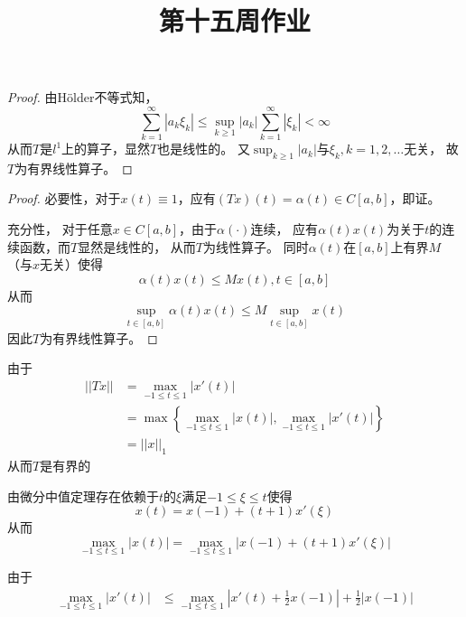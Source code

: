 \documentclass[cn]{homework}
\title{第十五周作业}
\begin{document}
    \maketitle

    \problem
    \begin{proof}
        由H\"older不等式知，
        \[\sum_{k=1}^\infty |a_k\xi_k|
        \leq\sup_{k\geq 1}|a_k|\sum_{k=1}^\infty|\xi_k|<\infty\]
        从而$T$是$l^1$上的算子，显然$T$也是线性的。
        又$\sup_{k\geq 1}|a_k|$与$\xi_k,k=1,2,\ldots$无关，
        故$T$为有界线性算子。

    \end{proof}

    \problem
    \begin{proof}
        必要性，对于$x(t)\equiv 1$，应有$(Tx)(t)=\alpha(t)\in C[a,b]$，即证。
        
        充分性，
        对于任意$x\in C[a,b]$，由于$\alpha(\cdot)$连续，
        应有$\alpha(t)x(t)$为关于$t$的连续函数，而$T$显然是线性的，
        从而$T$为线性算子。
        同时$\alpha(t)$在$[a,b]$上有界$M$（与$x$无关）使得
        \[\alpha(t)x(t)\leq Mx(t),t\in[a,b]\]
        从而
        \[\sup_{t\in[a,b]}\alpha(t)x(t)\leq M\sup_{t\in[a,b]}x(t)\]
        因此$T$为有界线性算子。
    \end{proof}

    \problem
    \begin{subproblem}[(\arabic*)]
        \item
        由于
        \[\begin{aligned}
            ||Tx||&=\max_{-1\leq t\leq 1}|x'(t)|\\
            &=\max\left\{\max_{-1\leq t\leq 1}|x(t)|,\max_{-1\leq t\leq 1}|x'(t)|\right\}\\
            &=||x||_1
        \end{aligned}\]
        从而$T$是有界的
        
        \item
        由微分中值定理存在依赖于$t$的$\xi$满足$-1\leq\xi\leq t$使得
        \[x(t)=x(-1)+(t+1)x'(\xi)\]
        从而
        \[\max_{-1\leq t\leq 1}|x(t)|
        =\max_{-1\leq t\leq 1}|x(-1)+(t+1)x'(\xi)|\]

        由于
        \[\begin{aligned}
            \max_{-1\leq t\leq 1}|x'(t)|
            &\leq\max_{-1\leq t\leq 1}\left|x'(t)+\frac{1}{2}x(-1)\right|
            +\frac{1}{2}|x(-1)|
        \end{aligned}\]
    \end{subproblem}
\end{document}
